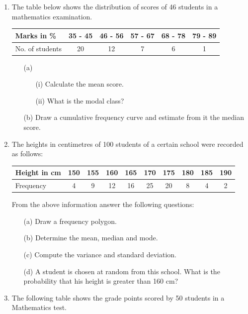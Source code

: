 \begin{enumerate}
	\item The table below shows the distribution of scores of 46 students in a mathematics examination.\\
	
	\begin{tabular}{|l|c|c|c|c|c|} \hline
	Marks in \%&35 - 45&46 - 56&57 - 67&68 - 78&79 - 89 \\ \hline
	No. of students&20&12&7&6&1 \\ \hline	
	\end{tabular}
	
	\begin{itemize}
	\item[(a)] 
		\begin{itemize}
		\item[(i)] Calculate the mean score.
		\item[(ii)] What is the modal class?
		\end{itemize}		 
	\item[(b)] Draw a cumulative frequency curve and estimate from  it the median score.
	\end{itemize} 
	
	\item The heights in centimetres of 100 students of a certain school were recorded as follows:\\
	
	\begin{tabular}{|l|c|c|c|c|c|c|c|c|c|} \hline
	Height in cm&150&155&160&165&170&175&180&185&190 \\ \hline
	Frequency&4&9&12&16&25&20&8&4&2 \\ \hline	
	\end{tabular}
	
	From the above information answer the following questions:
	\begin{itemize}
	\item[(a)] Draw a frequency polygon.
	\item[(b)] Determine the mean, median and mode.
	\item[(c)] Compute the variance and standard deviation.
	\item[(d)] A student is chosen at random from this school. What is the probability that his height is greater than 160 cm?
	\end{itemize} 
	
	\item The following table shows the grade points scored by 50 students in a Mathematics test.\\
	

\end{enumerate}
